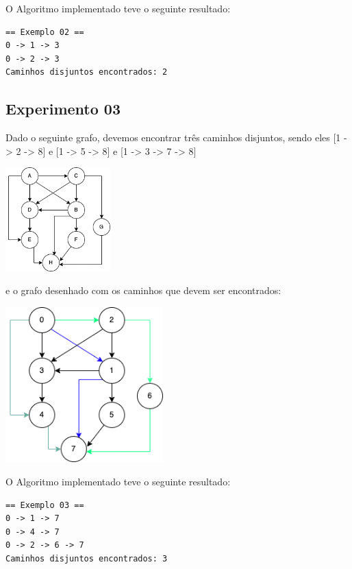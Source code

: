 O Algoritmo implementado teve o seguinte resultado:

\begin{scriptsize}
\estiloR
\begin{lstlisting}[title={Exemplo 02}, label=lst:javacode]
 == Exemplo 02 == 
0 -> 1 -> 3
0 -> 2 -> 3
Caminhos disjuntos encontrados: 2 
\end{lstlisting}
\end{scriptsize}

\subsection{Experimento 03}

Dado o seguinte grafo, devemos encontrar três caminhos disjuntos, sendo eles [1 -> 2 -> 8] e [1 -> 5 -> 8] e [1 -> 3 -> 7 -> 8]

\begin{center}
\includegraphics[height=4cm]{figuras/03.png}
\end{center}

e o grafo desenhado com os caminhos que devem ser encontrados:

\begin{center}
\includegraphics[height=6cm]{figuras/03_caminhos.png}
\end{center}


O Algoritmo implementado teve o seguinte resultado:

\begin{scriptsize}
\estiloR
\begin{lstlisting}[title={Exemplo 03}, label=lst:javacode]
 == Exemplo 03 == 
0 -> 1 -> 7
0 -> 4 -> 7
0 -> 2 -> 6 -> 7
Caminhos disjuntos encontrados: 3 
\end{lstlisting}
\end{scriptsize}


